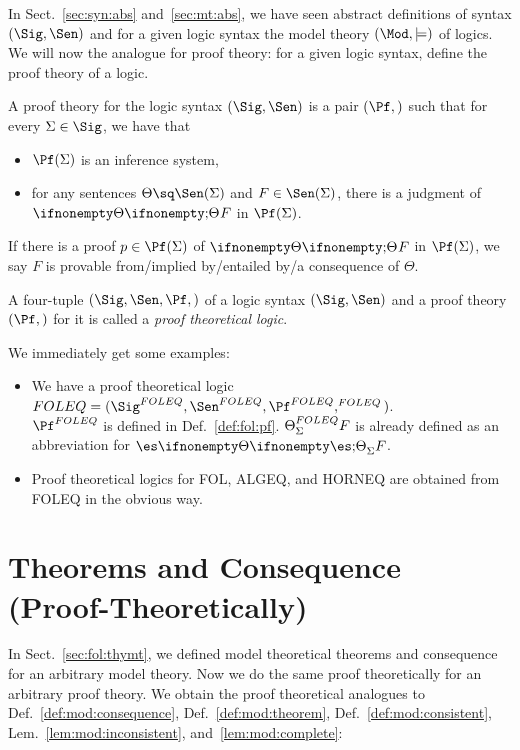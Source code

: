 In Sect.~\ref{sec:syn:abs} and~\ref{sec:mt:abs}, we have seen abstract definitions of syntax $(\Sig,\Sen)$ and for a given logic syntax the model theory $(\Mod,\md)$ of logics. We will now the analogue for proof theory: for a given logic syntax, define the proof theory of a logic.

\begin{definition}\label{def:pt:abs}
A proof theory for the logic syntax $(\Sig,\Sen)$ is a pair $(\Pf,\val)$ such that for every $\Sigma\in\Sig$, we have that
\begin{itemize}
    \item $\Pf(\Sigma)$ is an inference system,
    \item for any sentences $\Theta\sq\Sen(\Sigma)$ and $F\in\Sen(\Sigma)$, there is a judgment of $\iscons{}{}{\Theta}{F}$ in $\Pf(\Sigma)$.
\end{itemize}
If there is a proof $p\in\Pf(\Sigma)$ of $\iscons{}{}{\Theta}{F}$ in $\Pf(\Sigma)$, we say $F$ is provable from/implied by/entailed by/a consequence of $\Theta$.

A four-tuple $(\Sig,\Sen,\Pf,\val)$ of a logic syntax $(\Sig,\Sen)$ and a proof theory $(\Pf,\val)$ for it is called a \emph{proof theoretical logic}. 
\end{definition}

\begin{example}\label{ex:pt:abs}
We immediately get some examples:
\begin{itemize}
\item We have a proof theoretical logic $FOLEQ=(\Sig^{FOLEQ},\Sen^{FOLEQ},\Pf^{FOLEQ},\val^{FOLEQ})$. \\
  $\Pf^{FOLEQ}$ is defined in Def.~\ref{def:fol:pf}. $\Theta^{FOLEQ}_\Sigma F$ is already defined as an abbreviation for $\iscons{\Sigma}{\es}{\Theta}{F}$.
\item Proof theoretical logics for FOL, ALGEQ, and HORNEQ are obtained from FOLEQ in the obvious way.
\end{itemize}
\end{example}

\section{Theorems and Consequence (Proof-Theoretically)}\label{sec:fol:thypt}

In Sect.~\ref{sec:fol:thymt}, we defined model theoretical theorems and consequence for an arbitrary model theory. Now we do the same proof theoretically for an arbitrary proof theory. We obtain the proof theoretical analogues to Def.~\ref{def:mod:consequence}, Def.~\ref{def:mod:theorem}, Def.~\ref{def:mod:consistent}, Lem.~\ref{lem:mod:inconsistent}, and~\ref{lem:mod:complete}:


